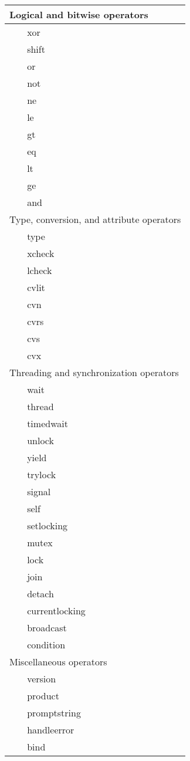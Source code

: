 \begin{longtable}{|r|l|l|p{4in}|}
\multicolumn{4}{|l|}{Logical and bitwise operators} \\
\hline \hline
& xor & & \\
\hline
& shift & & \\
\hline
& or & & \\
\hline
& not & & \\
\hline
& ne & & \\
\hline
& le & & \\
\hline
& gt & & \\
\hline
& eq & & \\
\hline
& lt & & \\
\hline
& ge & & \\
\hline
& and & & \\
\hline \hline
\multicolumn{4}{|l|}{Type, conversion, and attribute operators} \\
\hline \hline
& type & & \\
\hline
& xcheck & & \\
\hline
& lcheck & & \\
\hline
& cvlit & & \\
\hline
& cvn & & \\
\hline
& cvrs & & \\
\hline
& cvs & & \\
\hline
& cvx & & \\
\hline \hline
\multicolumn{4}{|l|}{Threading and synchronization operators} \\
\hline \hline
& wait & & \\
\hline
& thread & & \\
\hline
& timedwait & & \\
\hline
& unlock & & \\
\hline
& yield & & \\
\hline
& trylock & & \\
\hline
& signal & & \\
\hline
& self & & \\
\hline
& setlocking & & \\
\hline
& mutex & & \\
\hline
& lock & & \\
\hline
& join & & \\
\hline
& detach & & \\
\hline
& currentlocking & & \\
\hline
& broadcast & & \\
\hline
& condition & & \\
\hline \hline
\multicolumn{4}{|l|}{Miscellaneous operators} \\
\hline \hline
& version & & \\
\hline
& product & & \\
\hline
& promptstring & & \\
\hline
& handleerror & & \\
\hline
& bind & & \\
\end{longtable}

